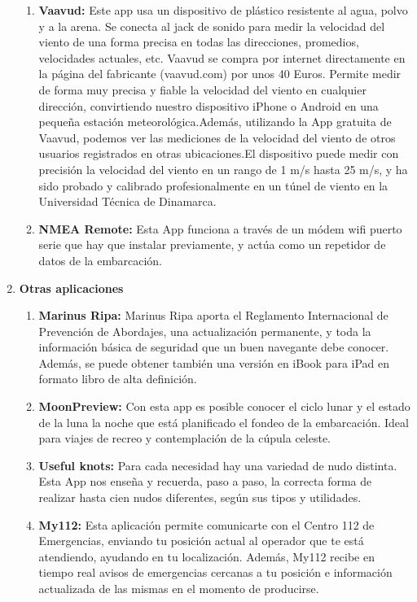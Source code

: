 \begin{enumerate}
\begin{enumerate}
   \item \textbf{Vaavud:} Este app usa un dispositivo de plástico  resistente al agua, polvo y a la arena. Se conecta al jack de sonido para medir la velocidad del viento de una forma precisa en todas las direcciones, promedios, velocidades actuales, etc. Vaavud se compra por internet directamente en la página del fabricante (vaavud.com) por unos 40 Euros. Permite medir de forma muy precisa y fiable la velocidad del viento en cualquier dirección, convirtiendo nuestro dispositivo iPhone o Android en una pequeña estación meteorológica.Además, utilizando la App gratuita de Vaavud, podemos ver las mediciones de la velocidad del viento de otros usuarios registrados en otras ubicaciones.El dispositivo puede medir con precisión la velocidad del viento en un rango de 1 m/s hasta 25 m/s, y ha sido probado y calibrado profesionalmente en un túnel de viento en la Universidad Técnica de Dinamarca.
   \item \textbf{NMEA Remote:}  Esta App funciona a través de un módem wifi puerto serie que hay que instalar previamente, y actúa como un repetidor de datos de la embarcación.
\end{enumerate}
 
\item \textbf{Otras aplicaciones}
\begin{enumerate}

    \item \textbf{Marinus Ripa:} Marinus Ripa aporta el Reglamento Internacional de Prevención de Abordajes, una actualización permanente, y toda la información básica de seguridad que un buen navegante debe conocer. Además, se puede obtener también una versión en iBook para iPad en formato libro de alta definición.
    \item \textbf{MoonPreview:} Con esta app es posible conocer el ciclo lunar y el estado de la luna la noche que está planificado el fondeo de la embarcación. Ideal para viajes de recreo y contemplación de la cúpula celeste.
   \item \textbf{Useful knots:}  Para cada necesidad hay una variedad de nudo distinta. Esta App nos enseña y recuerda, paso a paso, la correcta forma de realizar hasta cien nudos diferentes, según sus tipos y utilidades.
    \item \textbf{My112:} Esta aplicación permite comunicarte con el Centro 112 de Emergencias, enviando tu posición actual al operador que te está atendiendo, ayudando en tu localización. Además, My112 recibe en tiempo real avisos de emergencias cercanas a tu posición e información actualizada de las mismas en el momento de producirse.
\end{enumerate}


\end{enumerate}
